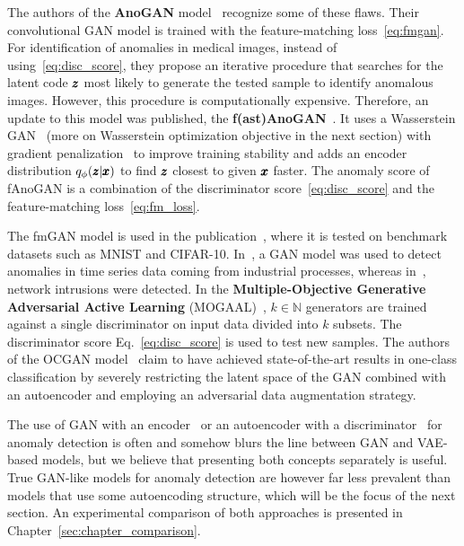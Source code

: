 The authors of the \textbf{AnoGAN} model~\cite{schlegl2017unsupervised} recognize some of these flaws. Their convolutional GAN model is trained with the feature-matching loss~\eqref{eq:fmgan}. For identification of anomalies in medical images, instead of using~\eqref{eq:disc_score}, they propose an iterative procedure that searches for the latent code $\pmb{{z}}$ most likely to generate the tested sample to identify anomalous images. However, this procedure is computationally expensive. Therefore, an update to this model was published, the \textbf{f(ast)AnoGAN}~\cite{schleglFAnoGANFastUnsupervised2019}. It uses a Wasserstein GAN~\cite{gulrajani2017improved,haloui2018anomaly} (more on Wasserstein optimization objective in the next section) with gradient penalization~\cite{gulrajani2017improved} to improve training stability and adds an encoder distribution $q_{\phi}(\pmb{{z}}|\pmb{{x}})$ to find $\pmb{{z}}$ closest to given $\pmb{{x}}$ faster. The anomaly score of fAnoGAN is a combination of the discriminator score~\eqref{eq:disc_score} and the feature-matching loss~\eqref{eq:fm_loss}. 

The fmGAN model is used in the publication~\cite{kliger2018novelty}, where it is tested on benchmark datasets such as MNIST and CIFAR-10. In~\cite{wang2018generative}, a GAN model was used to detect anomalies in time series data coming from industrial processes, whereas in~\cite{zenatiEfficientGANBasedAnomaly2018}, network intrusions were detected. In the \textbf{Multiple-Objective Generative Adversarial Active Learning} (MOGAAL)~\cite{liu2019generative}, $k \in \mathbb{N}$ generators are trained against a single discriminator on input data divided into $k$ subsets. The discriminator score Eq.~\eqref{eq:disc_score} is used to test new samples. The authors of the OCGAN model~\cite{perera2019ocgan} claim to have achieved state-of-the-art results in one-class classification by severely restricting the latent space of the GAN combined with an autoencoder and employing an adversarial data augmentation strategy. 

The use of GAN with an encoder~\cite{donahue2016adversarial} or an autoencoder with a discriminator~\cite{leveau2017adversarial} for anomaly detection is often and somehow blurs the line between GAN and VAE-based models, but we believe that presenting both concepts separately is useful. True GAN-like models for anomaly detection are however far less prevalent than models that use some autoencoding structure, which will be the focus of the next section. An experimental comparison of both approaches is presented in Chapter~\ref{sec:chapter_comparison}.

